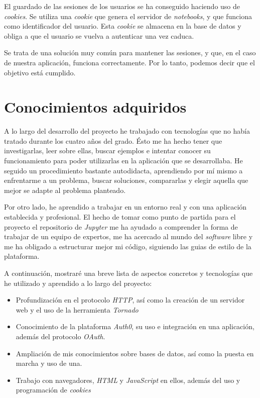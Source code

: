 \documentclass[11pt,spanish,listoffigures]{tfgetsinf}
\begin{document}
El guardado de las sesiones de los usuarios se ha conseguido haciendo uso de \textit{cookies}. Se utiliza una \textit{cookie} que genera el servidor de \textit{notebooks}, y que funciona como identificador del usuario. Esta \textit{cookie} se almacena en la base de datos y obliga a que el usuario se vuelva a autenticar una vez caduca.

Se trata de una solución muy común para mantener las sesiones, y que, en el caso de nuestra aplicación, funciona correctamente. Por lo tanto, podemos decir que el objetivo está cumplido.



\section{Conocimientos adquiridos}
\label{sec:conocimientos-adquiridos}

A lo largo del desarrollo del proyecto he trabajado con tecnologías que no había tratado durante los cuatro años del grado. Ésto me ha hecho tener que investigarlas, leer sobre ellas, buscar ejemplos e intentar conocer su funcionamiento para poder utilizarlas en la aplicación que se desarrollaba. He seguido un procedimiento bastante autodidacta, aprendiendo por mí mismo a enfrentarme a un problema, buscar soluciones, compararlas y elegir aquella que mejor se adapte al problema planteado.

Por otro lado, he aprendido a trabajar en un entorno real y con una aplicación establecida y profesional. El hecho de tomar como punto de partida para el proyecto el repositorio de \textit{Jupyter} me ha ayudado a comprender la forma de trabajar de un equipo de expertos, me ha acercado al mundo del \textit{software} libre y me ha obligado a estructurar mejor mi código, siguiendo las guias de estilo de la plataforma.

A continuación, mostraré una breve lista de aspectos concretos y tecnologías que he utilizado y aprendido a lo largo del proyecto:

\begin{itemize}

\item Profundización en el protocolo \textit{HTTP}, así como la creación de un servidor web y el uso de la herramienta \textit{Tornado}

\item Conocimiento de la plataforma \textit{Auth0}, su uso e integración en una aplicación, además del protocolo \textit{OAuth}.

\item Ampliación de mis conocimientos sobre bases de datos, así como la puesta en marcha y uso de una.

\item Trabajo con navegadores, \textit{HTML} y \textit{JavaScript} en ellos, además del uso y programación de \textit{cookies} 
\end{itemize}
\end{document}
